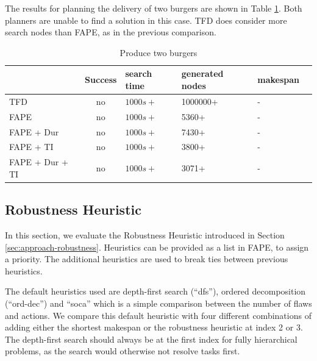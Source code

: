 The results for planning the delivery of two burgers are shown in Table \ref{tab:eval-burgers}.
Both planners are unable to find a solution in this case.
TFD does consider more search nodes than FAPE, as in the previous comparison.

\begin{table}
  \centering
  \begin{tabular}{lcllll}
    & Success & search time  & generated nodes & makespan         \\
  \hline
  TFD             & no & $1000s+$ & 1000000+ &  -       \\
  FAPE            & no & $1000s+$ & 5360+    &  -          \\
  FAPE + Dur      & no & $1000s+$ & 7430+    &  -    \\
  FAPE + TI       & no & $1000s+$ & 3800+    &  - \\
  FAPE + Dur + TI & no & $1000s+$ & 3071+    &  -          \\
  \end{tabular}
  \caption{Produce two burgers}
  \label{tab:eval-burgers}
\end{table}

\subsection{Robustness Heuristic}

In this section, we evaluate the Robustness Heuristic introduced in Section \ref{sec:approach-robustness}.
Heuristics can be provided as a list in FAPE, to assign a priority.
The additional heuristics are used to break ties between previous heuristics.

The default heuristics used are depth-first search (``dfs''), ordered decomposition (``ord-dec'') and ``soca'' which is a simple comparison between the number of flaws and actions.
We compare this default heuristic with four different combinations of adding either the shortest makespan or the robustness heuristic at index 2 or 3.
The depth-first search should always be at the first index for fully hierarchical problems, as the search would otherwise not resolve tasks first.



